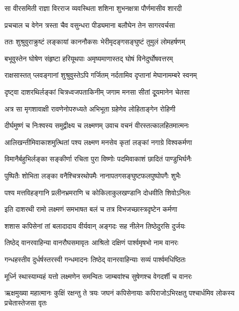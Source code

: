 
\twolineshloka
{सा वीरसमिती राज्ञा विरराज व्यवस्थिता}
{शशिना शुभनक्षत्रा पौर्णमासीव शारदी} %

\twolineshloka
{प्रचचाल च वेगेन त्रस्ता चैव वसुन्धरा}
{पीड्यमाना बलौघेन तेन सागरवर्चसा} %

\twolineshloka
{ततः शुश्रुवुराक्रुष्टं लङ्कायां काननौकसः}
{भेरीमृदङ्गसङ्घुष्टं तुमुलं लोमहर्षणम्} %

\twolineshloka
{बभूवुस्तेन घोषेण संहृष्टा हरियूथपाः}
{अमृष्यमाणास्तद् घोषं विनेदुर्घोषवत्तरम्} %

\twolineshloka
{राक्षसास्तत् प्लवङ्गानां शुश्रुवुस्तेऽपि गर्जितम्}
{नर्दतामिव दृप्तानां मेघानामम्बरे स्वनम्} %

\twolineshloka
{दृष्ट्वा दाशरथिर्लङ्कां चित्रध्वजपताकिनीम्}
{जगाम मनसा सीतां दूूयमानेन चेतसा} %

\twolineshloka
{अत्र सा मृगशावाक्षी रावणेनोपरुध्यते}
{अभिभूता ग्रहेणेव लोहिताङ्गेन रोहिणी} %

\twolineshloka
{दीर्घमुष्णं च निःश्वस्य समुद्वीक्ष्य च लक्ष्मणम्}
{उवाच वचनं वीरस्तत्कालहितमात्मनः} %

\twolineshloka
{आलिखन्तीमिवाकाशमुत्थितां पश्य लक्ष्मण}
{मनसेव कृतां लङ्कां नगाग्रे विश्वकर्मणा} %

\twolineshloka
{विमानैर्बहुभिर्लङ्का सङ्कीर्णा रचिता पुरा}
{विष्णोः पदमिवाकाशं छादितं पाण्डुभिर्घनैः} %

\twolineshloka
{पुष्पितैः शोभिता लङ्का वनैश्चित्ररथोपमैः}
{नानापतगसङ्घुष्टफलपुष्पोपगैः शुभैः} %

\twolineshloka
{पश्य मत्तविहङ्गानि प्रलीनभ्रमराणि च}
{कोकिलाकुलखण्डानि दोधवीति शिवोऽनिलः} %

\twolineshloka
{इति दाशरथी रामो लक्ष्मणं समभाषत}
{बलं च तत्र विभजच्छास्त्रदृष्टेन कर्मणा} %

\twolineshloka
{शशास कपिसेनां तां बलादादाय वीर्यवान्}
{अङ्गदः सह नीलेन तिष्ठेदुरसि दुर्जयः} %

\twolineshloka
{तिष्ठेद् वानरवाहिन्या वानरौघसमावृतः}
{आश्रितो दक्षिणं पार्श्वमृषभो नाम वानरः} %

\twolineshloka
{गन्धहस्तीव दुर्धर्षस्तरस्वी गन्धमादनः}
{तिष्ठेद् वानरवाहिन्याः सव्यं पार्श्वमधिष्ठितः} %

\twolineshloka
{मूर्ध्नि स्थास्याम्यहं यत्तो लक्ष्मणेन समन्वितः}
{जाम्बवांश्च सुषेणश्च वेगदर्शी च वानरः} %

\threelineshloka
{ऋक्षमुख्या महात्मानः कुक्षिं रक्षन्तु ते त्रयः}
{जघनं कपिसेनायाः कपिराजोऽभिरक्षतु}
{पश्चार्धमिव लोकस्य प्रचेतास्तेजसा वृतः} %

